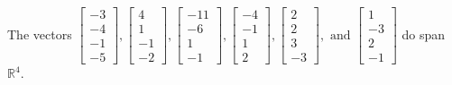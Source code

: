 \begin{exercise}
\begin{exerciseStatement}
  \end{exerciseStatement}
  \begin{exerciseAnswer}
   The vectors \(\left[\begin{array}{r}
-3 \\
-4 \\
-1 \\
-5
\end{array}\right] , \left[\begin{array}{r}
4 \\
1 \\
-1 \\
-2
\end{array}\right] , \left[\begin{array}{r}
-11 \\
-6 \\
1 \\
-1
\end{array}\right] , \left[\begin{array}{r}
-4 \\
-1 \\
1 \\
2
\end{array}\right] , \left[\begin{array}{r}
2 \\
2 \\
3 \\
-3
\end{array}\right] , \text{ and } \left[\begin{array}{r}
1 \\
-3 \\
2 \\
-1
\end{array}\right]\) 
  	 do  
	span \(\mathbb{R}^4\).
  


  \end{exerciseAnswer}
\end{exercise}